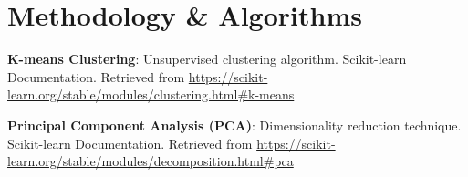 \documentclass[12pt,a4paper]{report}
\begin{document}
\section*{Methodology \& Algorithms}  
    \textbf{K-means Clustering}: Unsupervised clustering algorithm. Scikit-learn Documentation. Retrieved from \href{https://scikit-learn.org/stable/modules/clustering.html\#k-means}{https://scikit-learn.org/stable/modules/clustering.html\#k-means}  

    \textbf{Principal Component Analysis (PCA)}: Dimensionality reduction technique. Scikit-learn Documentation. Retrieved from \href{https://scikit-learn.org/stable/modules/decomposition.html\#pca}{https://scikit-learn.org/stable/modules/decomposition.html\#pca}
\end{document}
